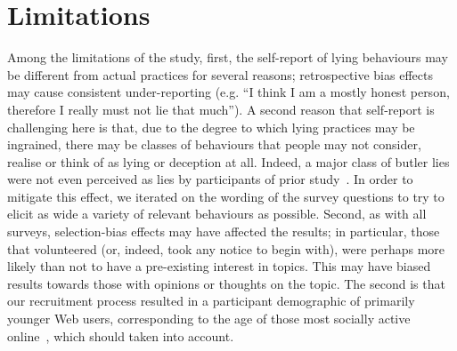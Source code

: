 \documentclass{sig-alternate}
\newcommand{\todo}[1]{\textbf{\color{red}TODO: #1}}
\newcommand{\example}[2]{%

\vspace{0.10cm}

\hspace{-3.9ex} \begin{tabular}{ p{0.6cm} p{7.15cm} }
    {\it \small (R#1)} & #2 \\
\end{tabular}%
\vspace{0.10cm}

}
\begin{document}








                 
\section{Limitations}

Among the limitations of the study, first, the self-report of lying behaviours may be different from actual practices for several reasons; retrospective bias effects may cause consistent under-reporting (e.g. ``I think I am a mostly honest person, therefore I really must not lie that much'').   A second reason that self-report is challenging here is that, due to the degree to which lying practices may be ingrained, there may be classes of behaviours that people may not consider, realise or think of as lying or deception at all.  Indeed, a major class of butler lies were not even perceived as lies by participants of prior study~\cite{hancock2009butler}.  In order to mitigate this effect, we iterated on the wording of the survey questions to try to elicit as wide a variety of relevant behaviours as possible. Second, as with all surveys, selection-bias effects may have affected the results; in particular, those that volunteered (or, indeed, took any notice to begin with), were perhaps more likely than not to have a pre-existing interest in topics.  This may have biased results towards those with opinions or thoughts on the topic.  The second is that our recruitment process resulted in a participant demographic of primarily younger Web users, corresponding to the age of those most socially active online~\cite{lenhart2010social}, which should taken into account.
\end{document}
